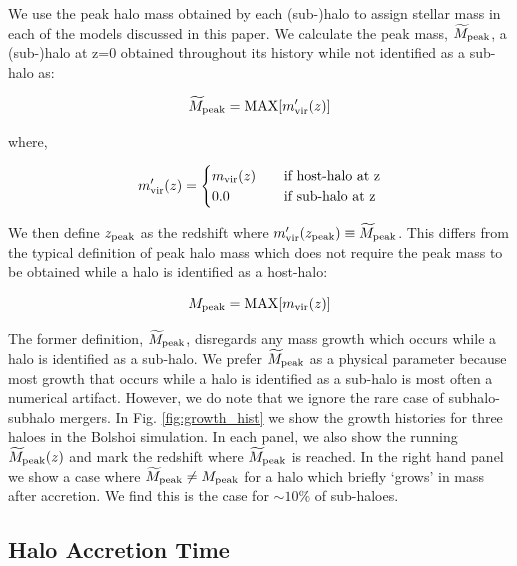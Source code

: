 \documentclass[a4paper,fleqn,usenatbib]{mnras}
\begin{document}
We use the peak halo mass obtained by each (sub-)halo to assign stellar mass in each of the models discussed in this paper.  We calculate the peak mass, $\widetilde{M}_{\rm peak}$, a (sub-)halo at z=0 obtained throughout its history while not identified as a sub-halo as:
%
\begin{linenomath}
\begin{equation}
\widetilde{M}_{\rm peak} = {\rm MAX}[m^{\prime}_{\rm vir}(z)]
\end{equation}
\end{linenomath}
%
where,
%
\begin{linenomath}
\begin{equation}
m^{\prime}_{\rm vir}(z)= 
\begin{cases}
    m_{\rm vir}(z)   & \quad \text{if host-halo at z}\\
    0.0                   & \quad \text{if sub-halo at z} \\
  \end{cases}
\end{equation}
\end{linenomath}
%
We then define $z_{\rm peak}$ as the redshift where $m^{\prime}_{\rm vir}(z_{\rm peak})\equiv \widetilde{M}_{\rm peak}$.  This differs from the typical definition of peak halo mass which does not require the peak mass to be obtained while a halo is identified as a host-halo:
%
\begin{linenomath}
\begin{equation}
M_{\rm peak} = {\rm MAX}[m_{\rm vir}(z)]
\end{equation}
\end{linenomath}
%
The former definition, $\widetilde{M}_{\rm peak}$, disregards any mass growth which occurs while a halo is identified as a sub-halo. We prefer $\widetilde{M}_{\rm peak}$ as a physical parameter because most growth that occurs while a halo is identified as a sub-halo is most often a numerical artifact.  However, we do note that we ignore the rare case of subhalo-subhalo mergers.  In Fig. \ref{fig:growth_hist} we show the growth histories for three haloes in the Bolshoi simulation.  In each panel, we also show the running $\widetilde{M}_{\rm peak}(z)$ and mark the redshift where $\widetilde{M}_{\rm peak}$ is reached.  In the right hand panel we show a case where $\widetilde{M}_{\rm peak} \neq {M}_{\rm peak}$ for a halo which briefly `grows' in mass after accretion.  We find this is the case for $\sim 10\%$ of sub-haloes.    


\subsection{Halo Accretion Time}
\label{sec:halo_acc_time}
\end{document}
